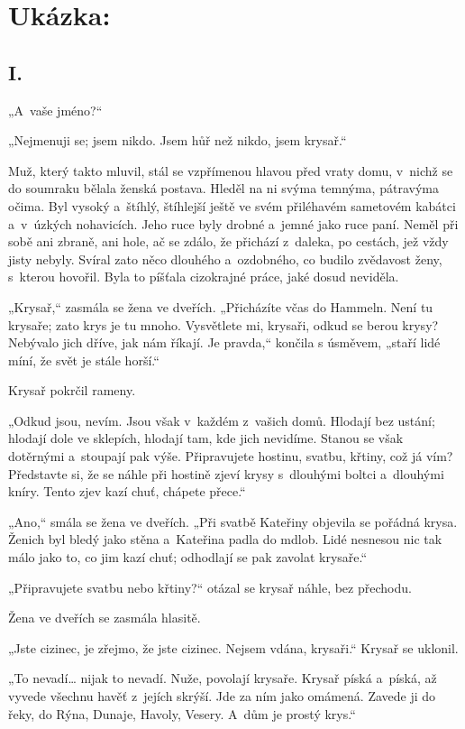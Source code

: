 \section*{Ukázka:}
\subsection*{I.}
„A~vaše jméno?“

„Nejmenuji se; jsem nikdo. Jsem hůř než nikdo, jsem krysař.“

Muž, který takto mluvil, stál se vzpřímenou hlavou před vraty domu, v~nichž se do soumraku bělala ženská postava. Hleděl na ni svýma temnýma, pátravýma očima. Byl vysoký a~štíhlý, štíhlejší ještě ve svém přiléhavém sametovém kabátci a~v~úzkých nohavicích. Jeho ruce byly drobné a~jemné jako ruce paní. Neměl při sobě ani zbraně, ani hole, ač se zdálo, že přichází z~daleka, po cestách, jež vždy jisty nebyly. Svíral zato něco dlouhého a~ozdobného, co budilo zvědavost ženy, s~kterou hovořil. Byla to píšťala cizokrajné práce, jaké dosud neviděla.

„Krysař,“ zasmála se žena ve dveřích. „Přicházíte včas do Hammeln. Není tu krysaře; zato krys je tu mnoho. Vysvětlete mi, krysaři, odkud se berou krysy? Nebývalo jich dříve, jak nám říkají. Je pravda,“ končila s úsměvem, „staří lidé míní, že svět je stále horší.“

Krysař pokrčil rameny.

„Odkud jsou, nevím. Jsou však v~každém z~vašich domů. Hlodají bez ustání; hlodají dole ve sklepích, hlodají tam, kde jich nevidíme. Stanou se však dotěrnými a~stoupají pak výše. Připravujete hostinu, svatbu, křtiny, což já vím? Představte si, že se náhle při hostině zjeví krysy s~dlouhými boltci a~dlouhými kníry. Tento zjev kazí chuť, chápete přece.“

„Ano,“ smála se žena ve dveřích. „Při svatbě Kateřiny objevila se pořádná krysa. Ženich byl bledý jako stěna a~Kateřina padla do mdlob. Lidé nesnesou nic tak málo jako to, co jim kazí chuť; odhodlají se pak zavolat krysaře.“

„Připravujete svatbu nebo křtiny?“ otázal se krysař náhle, bez přechodu.

Žena ve dveřích se zasmála hlasitě.

„Jste cizinec, je zřejmo, že jste cizinec. Nejsem vdána, krysaři.“ Krysař se uklonil.

„To nevadí… nijak to nevadí. Nuže, povolají krysaře. Krysař píská a~píská, až vyvede všechnu havěť z~jejích skrýší. Jde za ním jako omámená. Zavede ji do řeky, do Rýna, Dunaje, Havoly, Vesery. A~dům je prostý krys.“

